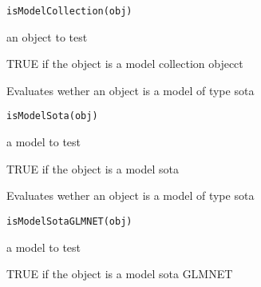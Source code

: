 \documentclass[a4paper]{book}
\begin{document}
%
\begin{Usage}
\begin{verbatim}
isModelCollection(obj)
\end{verbatim}
\end{Usage}
%
\begin{Arguments}
\begin{ldescription}
\item[\code{obj:}] an object to test
\end{ldescription}
\end{Arguments}
%
\begin{Value}
TRUE if the object is a model collection objecct
\end{Value}
%
\begin{Description}
Evaluates wether an object is a model of type sota
\end{Description}
%
\begin{Usage}
\begin{verbatim}
isModelSota(obj)
\end{verbatim}
\end{Usage}
%
\begin{Arguments}
\begin{ldescription}
\item[\code{obj:}] a model to test
\end{ldescription}
\end{Arguments}
%
\begin{Value}
TRUE if the object is a model sota
\end{Value}
%
\begin{Description}
Evaluates wether an object is a model of type sota
\end{Description}
%
\begin{Usage}
\begin{verbatim}
isModelSotaGLMNET(obj)
\end{verbatim}
\end{Usage}
%
\begin{Arguments}
\begin{ldescription}
\item[\code{mod:}] a model to test
\end{ldescription}
\end{Arguments}
%
\begin{Value}
TRUE if the object is a model sota GLMNET
\end{Value}
\end{document}
